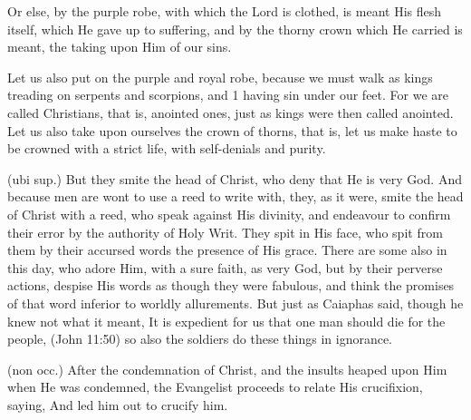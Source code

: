  Or else, by the purple robe, with which the Lord is clothed, is meant His flesh itself, which He gave up to suffering, and by the thorny crown which He carried is meant, the taking upon Him of our sins.

 Let us also put on the purple and royal robe, because we must walk as kings treading on serpents and scorpions, and 1 having sin under our feet. For we are called Christians, that is, anointed ones, just as kings were then called anointed. Let us also take upon ourselves the crown of thorns, that is, let us make haste to be crowned with a strict life, with self-denials and purity.

 (ubi sup.) But they smite the head of Christ, who deny that He is very God. And because men are wont to use a reed to write with, they, as it were, smite the head of Christ with a reed, who speak against His divinity, and endeavour to confirm their error by the authority of Holy Writ. They spit in His face, who spit from them by their accursed words the presence of His grace. There are some also in this day, who adore Him, with a sure faith, as very God, but by their perverse actions, despise His words as though they were fabulous, and think the promises of that word inferior to worldly allurements. But just as Caiaphas said, though he knew not what it meant, It is expedient for us that one man should die for the people, (John 11:50) so also the soldiers do these things in ignorance.

 

 (non occ.) After the condemnation of Christ, and the insults heaped upon Him when He was condemned, the Evangelist proceeds to relate His crucifixion, saying, And led him out to crucify him.

